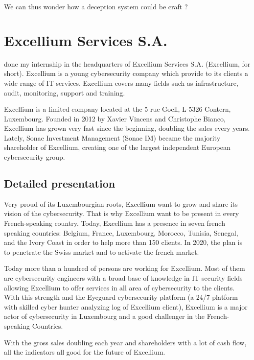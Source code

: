 \documentclass{tnreport}
\begin{document}
We can thus wonder how a deception system could be craft ?

\cleardoublepage

\chapter{Excellium Services S.A.}
 done my internship in the headquarters of Excellium Services S.A. (\gls{Excellium}, for short). \gls{Excellium} is a young cybersecurity company which provide to its clients a wide range of IT services. \gls{Excellium} covers many fields such as infrastructure, audit, monitoring, support and training.

\gls{Excellium} is a limited company located at the 5 rue Goell, L-5326 Contern, Luxembourg. Founded in 2012 by Xavier Vincens and Christophe Bianco, \gls{Excellium} has grown very fast since the beginning, doubling the sales every years. Lately, Sonae Investment Management (Sonae IM) became the majority shareholder of \gls{Excellium}, creating one of the largest independent European cybersecurity group.

\section{Detailed presentation}

Very proud of its Luxembourgian roots, \gls{Excellium} want to grow and share its vision of the cybersecurity. That is why \gls{Excellium} want to be present in every French-speaking country. Today, \gls{Excellium} has a presence in seven french speaking countries: Belgium, France, Luxembourg, Morocco, Tunisia, Senegal, and the Ivory Coast in order to help more than 150 clients. In 2020, the plan is to penetrate the Swiss market and to activate the french market.

Today more than a hundred of persons are working for \gls{Excellium}. Most of them are cybersecurity engineers with a broad base of knowledge in IT security fields allowing \gls{Excellium} to offer services in all area of cybersecurity to the clients. With this strength and the Eyeguard cybersecurity platform (a 24/7 platform with skilled cyber hunter analyzing log of \gls{Excellium} client), \gls{Excellium} is a major actor of cybersecurity in Luxembourg and a good challenger in the French-speaking Countries.

With the gross sales doubling each year and shareholders with a lot of cash flow, all the indicators all good for the future of \gls{Excellium}.
\end{document}
